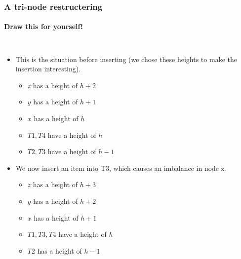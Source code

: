 \begin{frame}
	\frametitle{A tri-node restructering}
	\framesubtitle{Draw this for yourself!}
	\vspace{-15pt}
	\begin{columns}
		\begin{itemize}
			\item This is the situation before inserting (we chose these heights to make the insertion interesting).
				\pause
				\begin{itemize}
					\item $z$ has a height of $h+2$
					\item $y$ has a height of $h+1$
					\item $x$ has a height of $h$
					\item $T1,T4$ have a height of $h$
					\item $T2,T3$ have a height of $h-1$
				\end{itemize}
				\pause
			\item We now insert an item into T3, which causes an imbalance in node z.
				\pause
				\begin{itemize}
					\item $z$ has a height of $h+3$
					\item $y$ has a height of $h+2$
					\item $x$ has a height of $h+1$
					\item $T1,T3,T4$ have a height of $h$
					\item $T2$ has a height of $h-1$
				\end{itemize}
		\end{itemize}
			
	\end{columns}
\end{frame}

